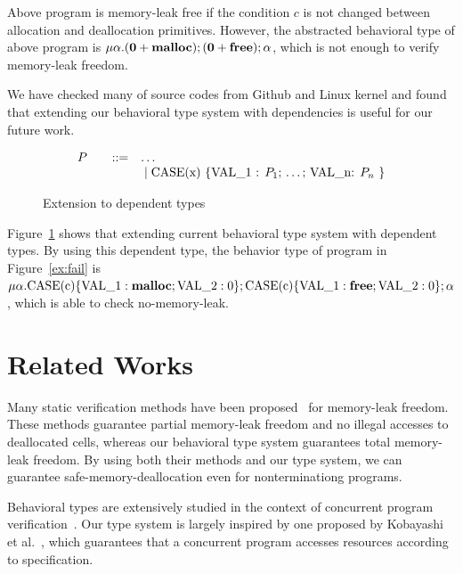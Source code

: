 \documentclass{sigplanconf}
\begin{document}
Above program is memory-leak free if the condition \(c\) is not
changed between allocation and deallocation primitives. However, the
abstracted behavioral type of above program is
\(\mu\alpha. (\mathbf{0} + \mathbf{malloc}); (\mathbf{0} + \mathbf{free}); \alpha\),
which is not enough to verify memory-leak freedom.

We have checked many of source codes from Github and Linux kernel and
found that extending our behavioral type system with dependencies is
useful for our future work.

\begin{figure}[h]
  \[
  \begin{array}{rlcl}
  P &  &::=& \ldots \\
  & & &\;|\; \mbox{CASE(x) \{VAL\_1 : $P_1$; \ldots ; VAL\_n: $P_n$  \}}\\
\end{array}
\]
\caption{Extension to dependent types}
\label{ex:beh}
\end{figure}

Figure~\ref{ex:beh} shows that extending current behavioral type
system with dependent types. By using this dependent type, the
behavior type of program in Figure~\ref{ex:fail} is
\(\mu\alpha. \mbox{CASE(c)} \{ \mbox{VAL\_1} : \mathbf{malloc}; \mbox{VAL\_2}:
0 \}; \mbox{CASE(c)}\{ \mbox{VAL\_1} : \mathbf{free}; \mbox{VAL\_2}: 0 \};
\alpha\), which is able to check no-memory-leak.

\section{Related Works}
Many static verification methods have been
proposed~\cite{DBLP:conf/aplas/SuenagaK09,DBLP:conf/pldi/HeineL03,DBLP:conf/sigsoft/XieA05,DBLP:journals/scp/SwamyHMGJ06,DBLP:conf/sas/OrlovichR06,DBLP:conf/issta/SuiYX12}
for memory-leak freedom. These methods guarantee partial memory-leak
freedom and no illegal accesses to deallocated cells, whereas our
behavioral type system guarantees total memory-leak freedom. By using
both their methods and our type system, we can guarantee
safe-memory-deallocation even for nonterminationg programs.

Behavioral types are extensively studied in the context of concurrent
program
verification~\cite{DBLP:conf/esop/HondaVK98,DBLP:journals/tcs/IgarashiK04,DBLP:conf/esop/VieiraCS08,DBLP:journals/lmcs/KobayashiSW06}.
Our type system is largely inspired by one proposed by Kobayashi et
al.~\cite{DBLP:journals/lmcs/KobayashiSW06}, which guarantees that a
concurrent program accesses resources according to specification.
\end{document}
